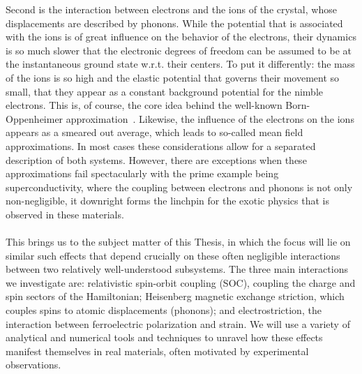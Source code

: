 Second is the interaction between electrons and the ions of the crystal, whose displacements are described by phonons.
While the potential that is associated with the ions is of great influence on the behavior of the electrons, their dynamics is so much slower that the electronic degrees of freedom can be assumed to be at the instantaneous ground state w.r.t. their centers.
To put it differently: the mass of the ions is so high and the elastic potential that governs their movement so small, that they appear as a constant background potential for the nimble electrons.
This is, of course, the core idea behind the well-known Born-Oppenheimer approximation~\cite{Born1927}.
Likewise, the influence of the electrons on the ions appears as a smeared out average, which leads to so-called mean field approximations.
In most cases these considerations allow for a separated description of both systems.
However, there are exceptions when these approximations fail spectacularly with the prime example being superconductivity, where the coupling between electrons and phonons is not only non-negligible, it downright forms the linchpin for the exotic physics that is observed in these materials.
\\\\
This brings us to the subject matter of this Thesis, in which the focus will lie on similar such effects that depend crucially on these often negligible interactions between two relatively well-understood subsystems.
The three main interactions we investigate are: relativistic spin-orbit coupling (SOC), coupling the charge and spin sectors of the Hamiltonian; Heisenberg magnetic exchange striction, which couples spins to atomic displacements (phonons); and electrostriction, the interaction between ferroelectric polarization and strain.
We will use a variety of analytical and numerical tools and techniques to unravel how these effects manifest themselves in real materials, often motivated by experimental observations.

